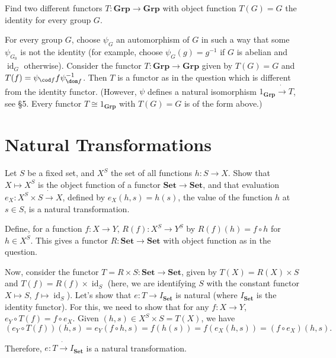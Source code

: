 \begin{exercise}
Find two different functors $T:\mathbf{Grp}\to\mathbf{Grp}$ with object function $T(G)=G$ the identity for every group $G$.
\end{exercise}
\begin{solution}
For every group $G$, choose $\psi_G$ an automorphism of $G$ in such a way that some $\psi_{G_0}$ is not the identity (for example, choose $\psi_G(g)=g^{-1}$ if $G$ is abelian and $\operatorname{id}_G$ otherwise). Consider the functor $T:\mathbf{Grp}\to\mathbf{Grp}$ given by $T(G)=G$ and $T(f)=\psi_{\cod f}f\psi_{\dom f}^{-1}$. Then $T$ is a functor as in the question which is different from the identity functor. (However, $\psi$ defines a natural isomorphism $1_\mathbf{Grp}\dot{\to} T$, see \S 5. Every functor $T\cong 1_{\mathbf{Grp}}$ with $T(G)=G$ is of the form above.)
\end{solution}

\section{Natural Transformations}

\begin{exercise}
Let $S$ be a fixed set, and $X^S$ the set of all functions $h:S\to X$. Show that $X\mapsto X^S$ is the object function of a functor $\mathbf{Set}\to \mathbf{Set}$, and that evaluation $e_X:X^S\times S\dot{\to}X$, defined by $e_X(h,s)=h(s)$, the value of the function $h$ at $s\in S$, is a natural transformation.
\end{exercise}
\begin{solution}
Define, for a function $f:X\to Y$, $R(f):X^S\to Y^S$ by $R(f)(h)=f\circ h$ for $h\in X^S$. This gives a functor $R:\mathbf{Set}\to\mathbf{Set}$ with object function as in the question.

Now, consider the functor $T=R\times S\colon\mathbf{Set}\to\mathbf{Set}$, given by $T(X)=R(X)\times S$ and $T(f)=R(f)\times\operatorname{id}_S$ (here, we are identifying $S$ with the constant functor $X\mapsto S$, $f\mapsto \operatorname{id}_S$). Let's show that $e:T\to I_\mathbf{Set}$ is natural (where $I_\mathbf{Set}$ is the identity functor). For this, we need to show that for any $f:X\to Y$, $e_Y\circ T(f)=f\circ e_X$. Given $(h,s)\in X^S\times S=T(X)$, we have
\[(e_Y\circ T(f))(h,s)=e_Y(f\circ h,s)=f(h(s))=f(e_X(h,s))=(f\circ e_X)(h,s).\]

Therefore, $e:T\dot{\to}I_\mathbf{Set}$ is a natural transformation.
\end{solution}

